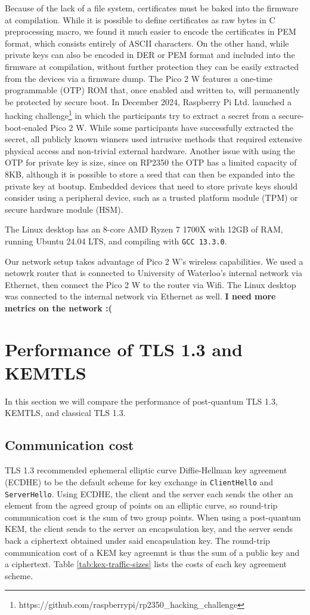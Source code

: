 \documentclass[letterpaper,12pt,titlepage,oneside,final]{book}
\begin{document}
Because of the lack of a file system, certificates must be baked into the firmware at compilation. 
While it is possible to define certificates as raw bytes in C preprocessing macro, we found it much easier to encode the certificates in PEM format, which consists entirely of ASCII characters.
On the other hand, while private keys can also be encoded in DER or PEM format and included into the firmware at compilation, without further protection they can be easily extracted from the devices via a firmware dump.
The Pico 2 W features a one-time programmable (OTP) ROM that, once enabled and written to, will permanently be protected by secure boot.
In December 2024, Raspberry Pi Ltd. launched a hacking challenge\footnote{https://github.com/raspberrypi/rp2350\_hacking\_challenge} in which the participants try to extract a secret from a secure-boot-enaled Pico 2 W.
While some participants have successfully extracted the secret, all publicly known winners used intrusive methods that required extensive physical access and non-trivial external hardware.
Another issue with using the OTP for private key is size, since on RP2350 the OTP has a limited capacity of 8KB, although it is possible to store a seed that can then be expanded into the private key at bootup.
Embedded devices that need to store private keys should consider using a peripheral device, such as a trusted platform module (TPM) or secure hardware module (HSM).

The Linux desktop has an 8-core AMD Ryzen 7 1700X with 12GB of RAM, running Ubuntu 24.04 LTS, and compiling with \texttt{GCC 13.3.0}.

Our network setup takes advantage of Pico 2 W's wireless capabilities. 
We used a netowrk router that is connected to University of Waterloo's internal network via Ethernet, then connect the Pico 2 W to the router via Wifi.
The Linux desktop was connected to the internal network via Ethernet as well.
\textbf{\color{red} I need more metrics on the network :(}

\section{Performance of TLS 1.3 and KEMTLS}
In this section we will compare the performance of post-quantum TLS 1.3, KEMTLS, and classical TLS 1.3.

\subsection{Communication cost}
TLS 1.3 recommended ephemeral elliptic curve Diffie-Hellman key agreement (ECDHE) to be the default scheme for key exchange in \texttt{ClientHello} and \texttt{ServerHello}.
Using ECDHE, the client and the server each sends the other an element from the agreed group of points on an elliptic curve, so round-trip communication cost is the sum of two group points.
When using a post-quantum KEM, the client sends to the server an encapsulation key, and the server sends back a ciphertext obtained under said encapsulation key.
The round-trip communication cost of a KEM key agreemnt is thus the sum of a public key and a ciphertext.
Table \ref{tab:kex-traffic-sizes} lists the costs of each key agreement scheme.
\end{document}
